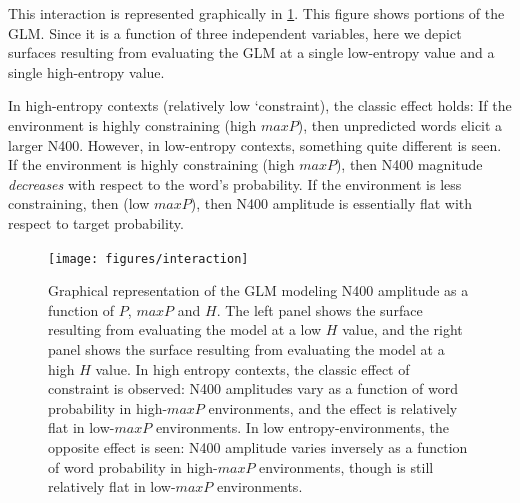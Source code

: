 \documentclass{article}
\begin{document}
This interaction is represented graphically in \ref{fig_interaction}. This figure shows portions of the GLM. Since it is a function of three independent variables, here we depict surfaces resulting from evaluating the GLM at a single low-entropy value and a single high-entropy value.

In high-entropy contexts (relatively low `constraint), the classic effect holds: If the environment is highly constraining (high $maxP$), then  unpredicted words elicit a larger N400. However, in low-entropy contexts, something quite different is seen. If the environment is highly constraining (high $maxP$), then N400 magnitude \emph{decreases} with respect to the word's probability. If the environment is less constraining, then (low $maxP$), then N400 amplitude is essentially flat with respect to target probability.


\begin{figure}
	\centering
		\texttt{[image: figures/interaction]}
	\caption{Graphical representation of the GLM modeling N400 amplitude as a function of $P$, $maxP$ and $H$. The left panel shows the surface resulting from evaluating the model at a low $H$ value, and the right panel shows the surface resulting from evaluating the model at a high $H$ value. In high entropy contexts, the classic effect of constraint is observed: N400 amplitudes vary as a function of word probability in high-$maxP$ environments, and the effect is relatively flat in low-$maxP$ environments. In low entropy-environments, the opposite effect is seen: N400 amplitude varies inversely as a function of word probability in high-$maxP$ environments, though is still relatively flat in low-$maxP$ environments. 
    \label{fig_interaction}}
\end{figure}
\end{document}
